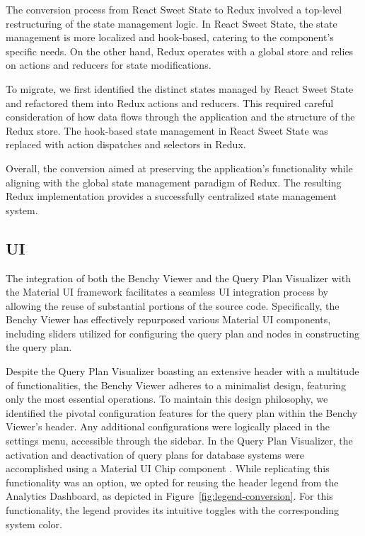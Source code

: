 The conversion process from React Sweet State to Redux involved a top-level restructuring of the state management logic. In React Sweet State, the state management is more localized and hook-based, catering to the component's specific needs. On the other hand, Redux operates with a global store and relies on actions and reducers for state modifications.

To migrate, we first identified the distinct states managed by React Sweet State and refactored them into Redux actions and reducers. This required careful consideration of how data flows through the application and the structure of the Redux store. The hook-based state management in React Sweet State was replaced with action dispatches and selectors in Redux.

Overall, the conversion aimed at preserving the application's functionality while aligning with the global state management paradigm of Redux. The resulting Redux implementation provides a successfully centralized state management system.


\subsection{UI}

The integration of both the Benchy Viewer and the Query Plan Visualizer with the Material UI framework facilitates a seamless UI integration process by allowing the reuse of substantial portions of the source code. Specifically, the Benchy Viewer has effectively repurposed various Material UI components, including sliders utilized for configuring the query plan and nodes in constructing the query plan.

Despite the Query Plan Visualizer boasting an extensive header with a multitude of functionalities, the Benchy Viewer adheres to a minimalist design, featuring only the most essential operations. To maintain this design philosophy, we identified the pivotal configuration features for the query plan within the Benchy Viewer's header. Any additional configurations were logically placed in the settings menu, accessible through the sidebar. In the Query Plan Visualizer, the activation and deactivation of query plans for database systems were accomplished using a Material UI Chip component \parencite{mui-chip}. While replicating this functionality was an option, we opted for reusing the header legend from the Analytics Dashboard, as depicted in Figure~\ref{fig:legend-conversion}. For this functionality, the legend provides its intuitive toggles with the corresponding system color.

